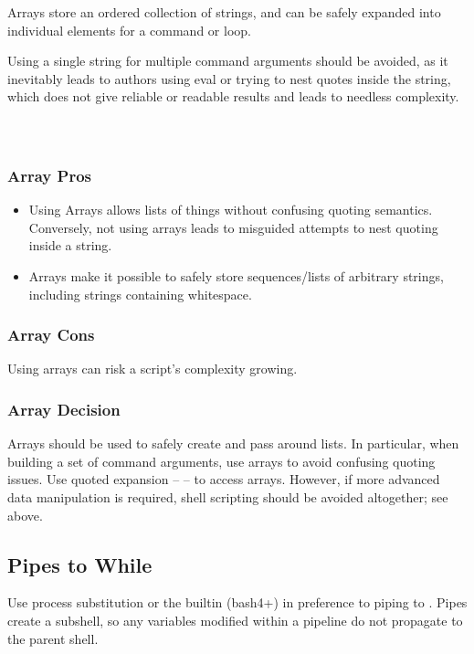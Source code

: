 \documentclass{article}
\begin{document}
Arrays store an ordered collection of strings, and can be safely expanded into individual elements for a command or loop.

Using a single string for multiple command arguments should be avoided, as it inevitably leads to authors using eval or trying to nest quotes inside the string, which does not give reliable or readable results and leads to needless complexity.

\inputminted[frame=single,firstline=315, lastline=320,linenos]{bash}{./styleguide.bash}

\inputminted[frame=single,firstline=322, lastline=325,linenos]{bash}{./styleguide.bash}

\inputminted[frame=single,firstline=327, lastline=340,linenos]{bash}{./styleguide.bash}

\subsubsection{Array Pros}
\begin{itemize}
    \item Using Arrays allows lists of things without confusing quoting semantics. Conversely, not using arrays leads to misguided attempts to nest quoting inside a string.
    \item Arrays make it possible to safely store sequences/lists of arbitrary strings, including strings containing whitespace.
\end{itemize}

\subsubsection{Array Cons}
Using arrays can risk a script’s complexity growing.

\subsubsection{Array Decision}
Arrays should be used to safely create and pass around lists. In particular, when building a set of command arguments, use arrays to avoid confusing quoting issues. Use quoted expansion – \hspace{8em}  – to access arrays. However, if more advanced data manipulation is required, shell scripting should be avoided altogether; see  above.

\subsection{Pipes to While}
\label{subsec:pipes_while}
Use process substitution or the  builtin (bash4+) in preference to piping to . Pipes create a subshell, so any variables modified within a pipeline do not propagate to the parent shell.
\end{document}
